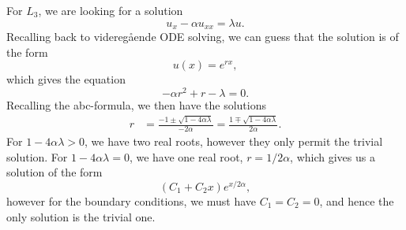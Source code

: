 \begin{solution}{5.6}
    For $L_3$, we are looking for a solution
    \begin{equation}
        u_x - \alpha u_{xx} = \lambda u.
    \end{equation}
    Recalling back to videregående ODE solving, we can guess that the solution is of the form
    \begin{equation}
        u(x) = e^{rx},
    \end{equation}
    which gives the equation
    \begin{equation}
        -\alpha r^2 + r - \lambda = 0.
    \end{equation}
    Recalling the abc-formula, we then have the solutions
    \begin{align}
        r &=
        \frac{-1 \pm \sqrt{1 - 4 \alpha \lambda}}{-2 \alpha}
        = \frac{1 \mp \sqrt{1 - 4 \alpha \lambda}}{2 \alpha}.
    \end{align}
    For $1 - 4 \alpha \lambda > 0$, we have two real roots, however they only permit the trivial solution.
    For $1 - 4 \alpha \lambda = 0$, we have one real root, $r = 1 / 2\alpha$, which gives us a solution of the form
    \begin{equation}
        (C_1 + C_2 x) e^{x / 2\alpha},
    \end{equation}
    however for the boundary conditions, we must have $C_1 = C_2 = 0$, and hence the only solution is the trivial one.


\end{solution}
